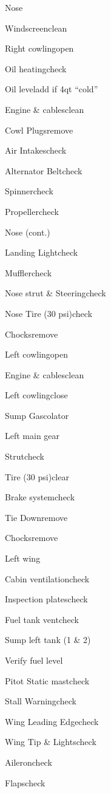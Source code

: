 \begin{multicols}{2}
\begin{checklist}{Nose}
  \item{Windscreen}{clean}
  \item{Right cowling}{open}
  \item{Oil heating}{check}
  \item{Oil level}{add if 4qt ``cold''}
  \item{Engine \& cables}{clean}
  \item{Cowl Plugs}{remove}
  \item{Air Intakes}{check}
  \item{Alternator Belt}{check}
  \item{Spinner}{check}
  \item{Propeller}{check}
\end{checklist}

\begin{checklist}{Nose (cont.)}
  \item{Landing Light}{check}
  \item{Muffler}{check}
  \item{Nose strut \& Steering}{check}
  \item{Nose Tire (30 psi)}{check}
  \item{Chocks}{remove}
  \item{Left cowling}{open}
  \item{Engine \& cables}{clean}
  \item{Left cowling}{close}
  \item{Sump Gascolator}{}
\end{checklist}

\begin{checklist}{Left main gear}
  \item{Strut}{check}
  \item{Tire (30 psi)}{clear}
  \item{Brake system}{check}
  \item{Tie Down}{remove}
  \item{Chocks}{remove}
\end{checklist}

\begin{checklist}{Left wing}
  \item{Cabin ventilation}{check}
  \item{Inspection plates}{check}
  \item{Fuel tank vent}{check}
  \item{Sump left tank (1 \& 2)}{}
  \item{Verify fuel level}{}
  \item{Pitot Static mast}{check}
  \item{Stall Warning}{check}
  \item{Wing Leading Edge}{check}
  \item{Wing Tip \& Lights}{check}
  \item{Aileron}{check}
  \item{Flaps}{check}
\end{checklist}


\end{multicols}
